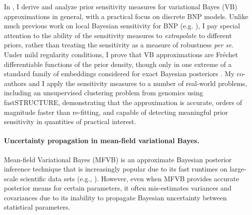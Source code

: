 In \citet{giordano:2021:bnpsensitivity}, I derive and analyze prior sensitivity
measures for variational Bayes (VB) approximations in general, with a practical
focus on discrete BNP models. Unlike much previous work on local Bayesian
sensitivity for BNP (e.g. \citet{Basu:2000:BNP_robustness}), I pay special
attention to the ability of the sensitivity measures to \emph{extrapolate} to
different priors, rather than treating the sensitivity as a measure of
robustness \textit{per se}. Under mild regularity conditions, I prove that VB
approximations are Fr{\'e}chet differentiable functions of the prior density,
though only in one extreme of a standard family of embeddings considered for
exact Bayesian posteriors \citep{gustafson:1996:localposterior}.
My co-authors and I apply the sensitivity measures to a number of real-world
problems, including an unsupervised clustering problem from genomics using
fastSTRUCTURE, demonstrating that the approximation is accurate, orders of
magnitude faster than re-fitting, and capable of detecting meaningful prior
sensitivity in quantities of practical interest.


\paragraph{Uncertainty propagation in mean-field variational Bayes.}
%
Mean-field Variational Bayes (MFVB) is an approximate Bayesian posterior
inference technique that is increasingly popular due to its fast runtimes on
large-scale scientific data sets (e.g., \citet{regier:2019:cataloging}).
However, even when MFVB provides accurate posterior means for certain
parameters, it often mis-estimates variances and covariances due to its
inability to propagate Bayesian uncertainty between statistical parameters.


